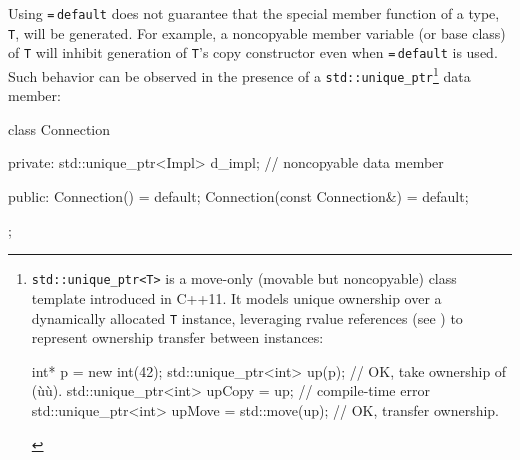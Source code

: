 Using \lstinline!=!\,\lstinline!default! does not guarantee that the special
member function of a type, \lstinline!T!, will be generated. For example, a
noncopyable member variable (or base class) of \lstinline!T! will inhibit
generation of \lstinline!T!'s copy constructor even when
\lstinline!=!\,\lstinline!default! is used. Such behavior can be observed in
the presence of a \lstinline!std::unique_ptr!{\cprotect\footnote{\lstinline!std::unique_ptr<T>!
is a move-only (movable but noncopyable) class template introduced in
C++11. It models unique ownership over a dynamically allocated
  \lstinline!T! instance, leveraging rvalue references (see )
  to represent ownership transfer between instances:

  \begin{emcppslisting}[language=C++, basicstyle={\ttfamily\footnotesize}]
  int* p = new int(42);
  std::unique_ptr<int> up(p);                   // OK, take ownership of (ù{}ù).
  std::unique_ptr<int> upCopy = up;             // compile-time error
  std::unique_ptr<int> upMove = std::move(up);  // OK, transfer ownership.
  \end{emcppslisting}
      }} data member:

\begin{emcppslisting}[language=C++]
class Connection
{
private:
    std::unique_ptr<Impl> d_impl;  // noncopyable data member

public:
    Connection() = default;
    Connection(const Connection&) = default;
};
\end{emcppslisting}
    
